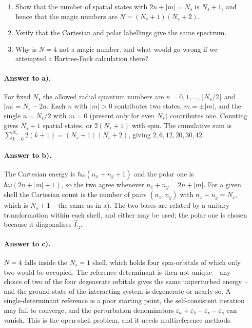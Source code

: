\begin{enumerate}
  \item[a)] Show that the number of spatial states with $2n+|m|=N_s$ is
  $N_s+1$, and hence that the magic numbers are $N=(N_s+1)(N_s+2)$.
  \item[b)] Verify that the Cartesian and polar labellings give the same
  spectrum.
  \item[c)] Why is $N=4$ not a magic number, and what would go wrong if we
  attempted a Hartree-Fock calculation there?
\end{enumerate}

\paragraph{Answer to a).}
For fixed $N_s$ the allowed radial quantum numbers are
$n=0,1,\dots,\lfloor N_s/2\rfloor$ and $|m|=N_s-2n$.  Each $n$ with $|m|>0$
contributes two states, $m=\pm|m|$, and the single $n=N_s/2$ with $m=0$
(present only for even $N_s$) contributes one.  Counting gives $N_s+1$ spatial
states, or $2(N_s+1)$ with spin.  The cumulative sum is
$\sum_{k=0}^{N_s}2(k+1)=(N_s+1)(N_s+2)$, giving $2,6,12,20,30,42$.

\paragraph{Answer to b).}
The Cartesian energy is $\hbar\omega(n_x+n_y+1)$ and the polar one is
$\hbar\omega(2n+|m|+1)$, so the two agree whenever $n_x+n_y=2n+|m|$.  For a
given shell the Cartesian count is the number of pairs $(n_x,n_y)$ with
$n_x+n_y=N_s$, which is $N_s+1$ -- the same as in a).  The two bases are
related by a unitary transformation within each shell, and either may be used;
the polar one is chosen because it diagonalises $\hat{L}_z$.

\paragraph{Answer to c).}
$N=4$ falls inside the $N_s=1$ shell, which holds four spin-orbitals of which
only two would be occupied.  The reference determinant is then not unique --
any choice of two of the four degenerate orbitals gives the same unperturbed
energy -- and the ground state of the interacting system is degenerate or
nearly so.  A single-determinant reference is a poor starting point, the
self-consistent iteration may fail to converge, and the perturbation
denominators $\varepsilon_a+\varepsilon_b-\varepsilon_r-\varepsilon_s$ can
vanish.  This is the open-shell problem, and it needs multireference methods.

